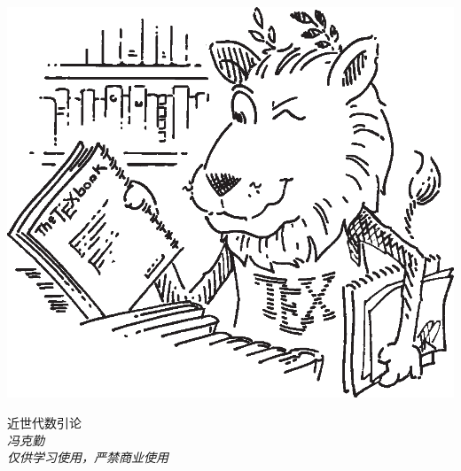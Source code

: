\documentclass[hyperref,oneside,UTF8,scheme=chinese,heading=true]{book}
\begin{document}
    \begin{titlepage}
        \includegraphics[scale=1.4]{Figure/ctanlion.eps}
        \begin{center}
            \Huge{近世代数引论}\\ %
            \vspace{15pt}
            \Large\itshape{冯克勤}\\
			\Large\itshape{仅供学习使用，严禁商业使用}
        \end{center}
    \end{titlepage}
    \frontmatter
    
    \mainmatter
    \tableofcontents
    
    
\end{document}
